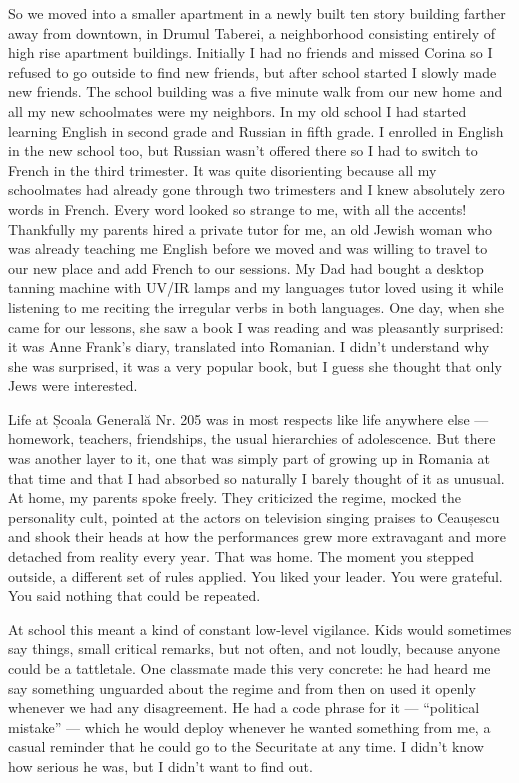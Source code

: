 \documentclass[12pt]{book}
\begin{document}
So we moved into a smaller apartment in a newly built ten story building
farther away from downtown, in Drumul Taberei, a neighborhood consisting
entirely of high rise apartment buildings. Initially I had no friends
and missed Corina so I refused to go outside to find new friends, but
after school started I slowly made new friends. The school building was
a five minute walk from our new home and all my new schoolmates were my
neighbors. In my old school I had started learning English in second
grade and Russian in fifth grade. I enrolled in English in the new
school too, but Russian wasn't offered there so I had to switch to
French in the third trimester. It was quite disorienting because all my
schoolmates had already gone through two trimesters and I knew
absolutely zero words in French. Every word looked so strange to me,
with all the accents! Thankfully my parents hired a private tutor for
me, an old Jewish woman who was already teaching me English before we
moved and was willing to travel to our new place and add French to our
sessions. My Dad had bought a desktop tanning machine with UV/IR lamps
and my languages tutor loved using it while listening to me reciting the
irregular verbs in both languages. One day, when she came for our
lessons, she saw a book I was reading and was pleasantly surprised: it
was Anne Frank's diary, translated into Romanian. I didn't understand
why she was surprised, it was a very popular book, but I guess she
thought that only Jews were interested.

Life at Școala Generală Nr. 205 was in most respects like life anywhere
else --- homework, teachers, friendships, the usual hierarchies of
adolescence. But there was another layer to it, one that was simply part
of growing up in Romania at that time and that I had absorbed so
naturally I barely thought of it as unusual. At home, my parents spoke
freely. They criticized the regime, mocked the personality cult, pointed
at the actors on television singing praises to Ceaușescu and shook their
heads at how the performances grew more extravagant and more detached
from reality every year. That was home. The moment you stepped outside,
a different set of rules applied. You liked your leader. You were
grateful. You said nothing that could be repeated.

At school this meant a kind of constant low-level vigilance. Kids would
sometimes say things, small critical remarks, but not often, and not
loudly, because anyone could be a tattletale. One classmate made this
very concrete: he had heard me say something unguarded about the regime
and from then on used it openly whenever we had any disagreement. He had
a code phrase for it --- ``political mistake'' --- which he would deploy
whenever he wanted something from me, a casual reminder that he could go
to the Securitate at any time. I didn't know how serious he was, but I
didn't want to find out.
\end{document}
